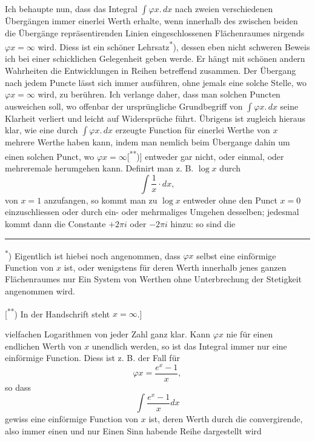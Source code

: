 \indent Ich behaupte nun, dass das Integral $\int\varphi x{.}\,dx$ nach zweien verschiedenen Übergängen immer einerlei Werth erhalte, wenn innerhalb des zwischen beiden die Übergänge repräsentirenden Linien eingeschlossenen Flächenraumes nirgends $\varphi x=\infty$ wird. Diess ist ein schöner Lehrsatz\textsuperscript{*}), dessen eben nicht schweren Beweis ich bei einer schicklichen Gelegenheit geben werde. Er hängt mit schönen andern Wahrheiten die Entwicklungen in Reihen betreffend zusammen. Der Übergang nach jedem Puncte lässt sich immer ausführen, ohne jemals eine solche Stelle, wo $\varphi x=\infty$ wird, zu berühren. Ich verlange daher, dass man solchen Puncten ausweichen soll, wo offenbar der ursprüngliche Grundbegriff von $\int\varphi x{.}\,dx$ seine Klarheit verliert und leicht auf Widersprüche führt. Übrigens ist zugleich hieraus klar, wie eine durch $\int\varphi x{.}\,dx$ erzeugte Function für einerlei Werthe von $x$ mehrere Werthe haben kann, indem man nemlich beim Übergange dahin um einen solchen Punct, wo $\varphi x=\infty$[\textsuperscript{**})] entweder gar nicht, oder einmal, oder mehreremale herumgehen kann. Definirt man z. B. $\log x$ durch
\[
\int\frac{1}{x}\cdot dx,
\]
\noindent von $x=1$ anzufangen, so kommt man zu $\log x$ entweder ohne den Punct $x=0$ einzuschliessen oder durch ein- oder mehrmaliges Umgehen desselben; jedesmal kommt dann die Constante $+2\pi i$ oder $-2\pi i$ hinzu: so sind die
\par\medskip\noindent\rule{.24\linewidth}{.4pt}\par\smallskip
\noindent\hspace*{\parindent}\textsuperscript{*}) Eigentlich ist hiebei noch angenommen, dass $\varphi x$ selbst eine einförmige Function von $x$ ist, oder wenigstens für deren Werth innerhalb jenes ganzen Flächenraumes nur Ein System von Werthen ohne Unterbrechung der Stetigkeit angenommen wird.
\par{\small
\noindent\hspace*{\parindent}[\textsuperscript{**}) In der Handschrift steht $x=\infty$.]
\par}
\clearpage{}
\noindent vielfachen Logarithmen von jeder Zahl ganz klar. Kann $\varphi x$ nie für einen endlichen Werth von $x$ unendlich werden, so ist das Integral immer nur eine einförmige Function. Diess ist z. B. der Fall für
\[
\varphi x=\frac{e^x-1}{x},
\]
\noindent so dass
\[
\int\frac{e^x-1}{x}dx
\]
\noindent gewiss eine einförmige Function von $x$ ist, deren Werth durch die  convergirende, also immer einen und nur Einen Sinn habende Reihe dargestellt wird
